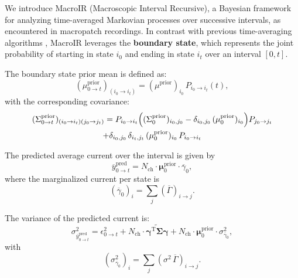 \documentclass[9pt]{elife}
\begin{document}
	We introduce MacroIR (Macroscopic Interval Recursive), a Bayesian framework for analyzing time-averaged Markovian processes over successive intervals, as encountered in macropatch recordings. In contrast with previous time-averaging algorithms \cite{Munch2022}, 
	MacroIR leverages the \textbf{boundary state}, which represents the joint probability of starting in state \(i_0\) and ending in state \(i_t\) over an interval \([0,t]\).
	
	The boundary state prior mean is defined as:
	\begin{equation}
		(\mu^{\text{prior}}_{0 \rightarrow t})_{(i_0 \rightarrow i_t)} = (\mu^{\text{prior}})_{i_0} \, P_{i_0 \rightarrow i_t}(t),
		\label{eq:boundary_mean_prior}
	\end{equation}
	with the corresponding covariance:
	\begin{multline}
		(\Sigma^{\text{prior}}_{0 \rightarrow t})_{(i_0 \rightarrow i_t)(j_0 \rightarrow j_t)} = P_{i_0 \rightarrow i_t}\Bigl((\Sigma^{\text{prior}}_0)_{i_0,j_0} - \delta_{i_0,j_0}\, (\mu^{\text{prior}}_0)_{i_0}\Bigr) P_{j_0 \rightarrow j_t} \\
		+ \delta_{i_0,j_0}\,\delta_{i_t,j_t}\, (\mu^{\text{prior}}_0)_{i_0}\, P_{i_0 \rightarrow i_t}
		\label{eq:boundary_covariance_prior}
	\end{multline}
	
	The predicted average current over the interval is given by
	\begin{equation}
		\overline{y}^{\text{pred}}_{0 \rightarrow t} = N_{\text{ch}} \cdot \mathbf{\mu}^{\text{prior}}_{0} \cdot \overline{\gamma}_{0},
		\label{eq:macro_interval_predicted_y}
	\end{equation}
	where the marginalized current per state is
	\begin{equation}
		(\overline{\gamma}_{0})_i = \sum_j (\overline{\Gamma})_{i \rightarrow j}.
	\end{equation}
	
	The variance of the predicted current is:
	\begin{equation}
		\sigma^2_{\overline{y}^{\text{pred}}_{0 \rightarrow t}} = \epsilon^2_{0 \rightarrow t} + N_{\text{ch}} \cdot \widetilde{\mathbf{\gamma}^{\mathrm{T}} \mathbf{\Sigma}\mathbf{\gamma}} + N_{\text{ch}} \cdot \mathbf{\mu}^{\text{prior}}_{0} \cdot \sigma^2_{\overline{\gamma}_{0}},
		\label{eq:macro_interval_sigma_pred}
	\end{equation}
	with
	\begin{equation}
		(\sigma^2_{\overline{\gamma}_{0}})_i = \sum_j (\sigma^2\,\overline{\Gamma})_{i \rightarrow j}.
	\end{equation}
	
\end{document}
